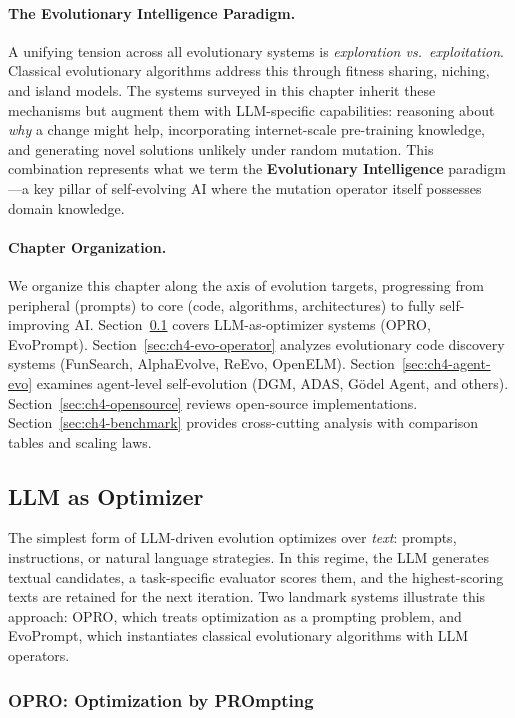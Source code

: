 \paragraph{The Evolutionary Intelligence Paradigm.}
A unifying tension across all evolutionary systems is \emph{exploration vs.\ exploitation}. Classical evolutionary algorithms address this through fitness sharing, niching, and island models. The systems surveyed in this chapter inherit these mechanisms but augment them with LLM-specific capabilities: reasoning about \emph{why} a change might help, incorporating internet-scale pre-training knowledge, and generating novel solutions unlikely under random mutation. This combination represents what we term the \textbf{Evolutionary Intelligence} paradigm---a key pillar of self-evolving AI where the mutation operator itself possesses domain knowledge.

\paragraph{Chapter Organization.}
We organize this chapter along the axis of evolution targets, progressing from peripheral (prompts) to core (code, algorithms, architectures) to fully self-improving AI. Section~\ref{sec:ch4-llm-optimizer} covers LLM-as-optimizer systems (OPRO, EvoPrompt). Section~\ref{sec:ch4-evo-operator} analyzes evolutionary code discovery systems (FunSearch, AlphaEvolve, ReEvo, OpenELM). Section~\ref{sec:ch4-agent-evo} examines agent-level self-evolution (DGM, ADAS, G\"{o}del Agent, and others). Section~\ref{sec:ch4-opensource} reviews open-source implementations. Section~\ref{sec:ch4-benchmark} provides cross-cutting analysis with comparison tables and scaling laws.


\subsection{LLM as Optimizer}
\label{sec:ch4-llm-optimizer}

The simplest form of LLM-driven evolution optimizes over \emph{text}: prompts, instructions, or natural language strategies. In this regime, the LLM generates textual candidates, a task-specific evaluator scores them, and the highest-scoring texts are retained for the next iteration. Two landmark systems illustrate this approach: OPRO, which treats optimization as a prompting problem, and EvoPrompt, which instantiates classical evolutionary algorithms with LLM operators.

\subsubsection{OPRO: Optimization by PROmpting}

